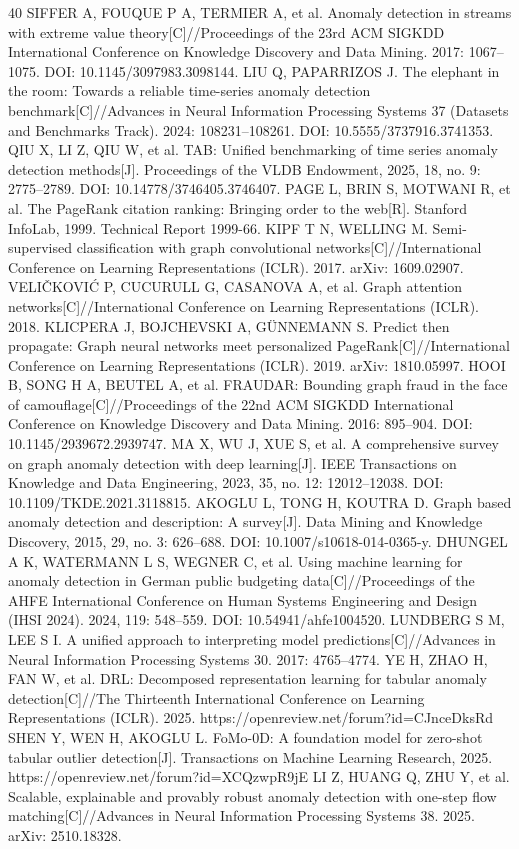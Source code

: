 \documentclass[twocolumn,11pt]{ctexart}
\begin{document}
\begin{thebibliography}{40}
 SIFFER A, FOUQUE P A, TERMIER A, et al. Anomaly detection in streams with extreme value theory[C]//Proceedings of the 23rd ACM SIGKDD International Conference on Knowledge Discovery and Data Mining. 2017: 1067–1075. DOI: 10.1145/3097983.3098144.
 LIU Q, PAPARRIZOS J. The elephant in the room: Towards a reliable time-series anomaly detection benchmark[C]//Advances in Neural Information Processing Systems 37 (Datasets and Benchmarks Track). 2024: 108231–108261. DOI: 10.5555/3737916.3741353.
 QIU X, LI Z, QIU W, et al. TAB: Unified benchmarking of time series anomaly detection methods[J]. Proceedings of the VLDB Endowment, 2025, 18, no. 9: 2775–2789. DOI: 10.14778/3746405.3746407.
 PAGE L, BRIN S, MOTWANI R, et al. The PageRank citation ranking: Bringing order to the web[R]. Stanford InfoLab, 1999. Technical Report 1999-66.
 KIPF T N, WELLING M. Semi-supervised classification with graph convolutional networks[C]//International Conference on Learning Representations (ICLR). 2017. arXiv: 1609.02907.
 VELIČKOVIĆ P, CUCURULL G, CASANOVA A, et al. Graph attention networks[C]//International Conference on Learning Representations (ICLR). 2018.
 KLICPERA J, BOJCHEVSKI A, GÜNNEMANN S. Predict then propagate: Graph neural networks meet personalized PageRank[C]//International Conference on Learning Representations (ICLR). 2019. arXiv: 1810.05997.
 HOOI B, SONG H A, BEUTEL A, et al. FRAUDAR: Bounding graph fraud in the face of camouflage[C]//Proceedings of the 22nd ACM SIGKDD International Conference on Knowledge Discovery and Data Mining. 2016: 895–904. DOI: 10.1145/2939672.2939747.
 MA X, WU J, XUE S, et al. A comprehensive survey on graph anomaly detection with deep learning[J]. IEEE Transactions on Knowledge and Data Engineering, 2023, 35, no. 12: 12012–12038. DOI: 10.1109/TKDE.2021.3118815.
 AKOGLU L, TONG H, KOUTRA D. Graph based anomaly detection and description: A survey[J]. Data Mining and Knowledge Discovery, 2015, 29, no. 3: 626–688. DOI: 10.1007/s10618-014-0365-y.
 DHUNGEL A K, WATERMANN L S, WEGNER C, et al. Using machine learning for anomaly detection in German public budgeting data[C]//Proceedings of the AHFE International Conference on Human Systems Engineering and Design (IHSI 2024). 2024, 119: 548–559. DOI: 10.54941/ahfe1004520.
 LUNDBERG S M, LEE S I. A unified approach to interpreting model predictions[C]//Advances in Neural Information Processing Systems 30. 2017: 4765–4774.
 YE H, ZHAO H, FAN W, et al. DRL: Decomposed representation learning for tabular anomaly detection[C]//The Thirteenth International Conference on Learning Representations (ICLR). 2025. https://openreview.net/forum?id=CJnceDksRd
 SHEN Y, WEN H, AKOGLU L. FoMo-0D: A foundation model for zero-shot tabular outlier detection[J]. Transactions on Machine Learning Research, 2025. https://openreview.net/forum?id=XCQzwpR9jE
 LI Z, HUANG Q, ZHU Y, et al. Scalable, explainable and provably robust anomaly detection with one-step flow matching[C]//Advances in Neural Information Processing Systems 38. 2025. arXiv: 2510.18328.
\end{thebibliography}
\end{document}
